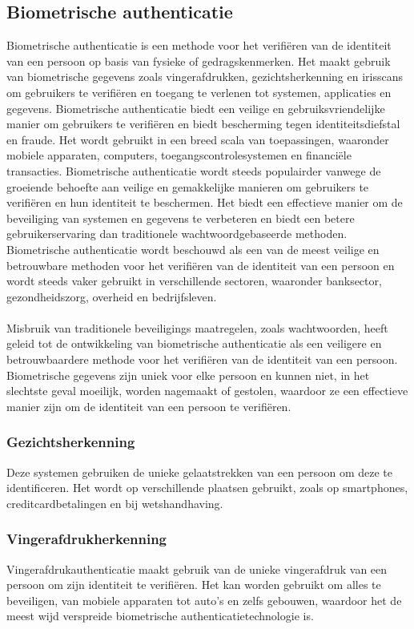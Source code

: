   \subsection{Biometrische authenticatie}%
  \label{subsec:biometrische-authenticatie}
  Biometrische authenticatie is een methode voor het verifiëren van de identiteit van een persoon op basis van fysieke of gedragskenmerken. Het maakt gebruik van biometrische gegevens zoals vingerafdrukken, gezichtsherkenning en irisscans om gebruikers te verifiëren en toegang te verlenen tot systemen, applicaties en gegevens. Biometrische authenticatie biedt een veilige en gebruiksvriendelijke manier om gebruikers te verifiëren en biedt bescherming tegen identiteitsdiefstal en fraude. Het wordt gebruikt in een breed scala van toepassingen, waaronder mobiele apparaten, computers, toegangscontrolesystemen en financiële transacties. Biometrische authenticatie wordt steeds populairder vanwege de groeiende behoefte aan veilige en gemakkelijke manieren om gebruikers te verifiëren en hun identiteit te beschermen. Het biedt een effectieve manier om de beveiliging van systemen en gegevens te verbeteren en biedt een betere gebruikerservaring dan traditionele wachtwoordgebaseerde methoden. Biometrische authenticatie wordt beschouwd als een van de meest veilige en betrouwbare methoden voor het verifiëren van de identiteit van een persoon en wordt steeds vaker gebruikt in verschillende sectoren, waaronder banksector, gezondheidszorg, overheid en bedrijfsleven.
  \\
  \\
  Misbruik van traditionele beveiligings maatregelen, zoals wachtwoorden, heeft geleid tot de ontwikkeling van biometrische authenticatie als een veiligere en betrouwbaardere methode voor het verifiëren van de identiteit van een persoon. Biometrische gegevens zijn uniek voor elke persoon en kunnen niet, in het slechtste geval moeilijk, worden nagemaakt of gestolen, waardoor ze een effectieve manier zijn om de identiteit van een persoon te verifiëren.
  
  \subsubsection{Gezichtsherkenning}%
  \label{subsubsec:gezichtsherkenning}
  Deze systemen gebruiken de unieke gelaatstrekken van een persoon om deze te identificeren. Het wordt op verschillende plaatsen gebruikt, zoals op smartphones, creditcardbetalingen en bij wetshandhaving.
  
  \subsubsection{Vingerafdrukherkenning}%
  \label{subsubsec:vingerafdrukherkenning}
  Vingerafdrukauthenticatie maakt gebruik van de unieke vingerafdruk van een persoon om zijn identiteit te verifiëren. Het kan worden gebruikt om alles te beveiligen, van mobiele apparaten tot auto's en zelfs gebouwen, waardoor het de meest wijd verspreide biometrische authenticatietechnologie is.
  
